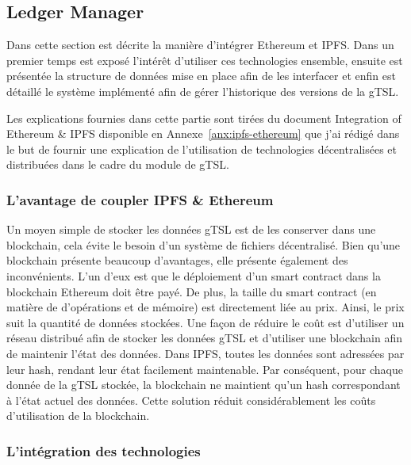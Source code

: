 \documentclass{tnreport}
\begin{document}
\subsection{Ledger Manager}
\label{sec:realisation-ledger}

Dans cette section est décrite la manière d'intégrer Ethereum et IPFS. Dans un premier temps est exposé l'intérêt d'utiliser ces technologies ensemble, ensuite est présentée la structure de données mise en place afin de les interfacer et enfin est détaillé le système implémenté afin de gérer l'historique des versions de la gTSL.

Les explications fournies dans cette partie sont tirées du document Integration of Ethereum \& IPFS disponible en Annexe~\ref{anx:ipfs-ethereum} que j'ai rédigé dans le but de fournir une explication de l'utilisation de technologies décentralisées et distribuées dans le cadre du module de gTSL.

\subsubsection{L'avantage de coupler IPFS \& Ethereum}

Un moyen simple de stocker les données gTSL est de les conserver dans une blockchain, cela évite le besoin d'un système de fichiers décentralisé. 
Bien qu'une blockchain présente beaucoup d'avantages, elle présente également des inconvénients.
L'un d'eux est que le déploiement d'un smart contract dans la blockchain Ethereum doit être payé.
De plus, la taille du smart contract (en matière de d'opérations et de mémoire) est directement liée au prix.
Ainsi, le prix suit la quantité de données stockées.
Une façon de réduire le coût est d'utiliser un réseau distribué afin de stocker les données gTSL et d'utiliser une blockchain afin de maintenir l'état des données.
Dans IPFS, toutes les données sont adressées par leur hash, rendant leur état facilement maintenable. Par conséquent, pour chaque donnée de la gTSL stockée, la blockchain ne maintient qu'un hash correspondant à l'état actuel des données. Cette solution réduit considérablement les coûts d'utilisation de la blockchain.

\subsubsection{L'intégration des technologies}
\end{document}
